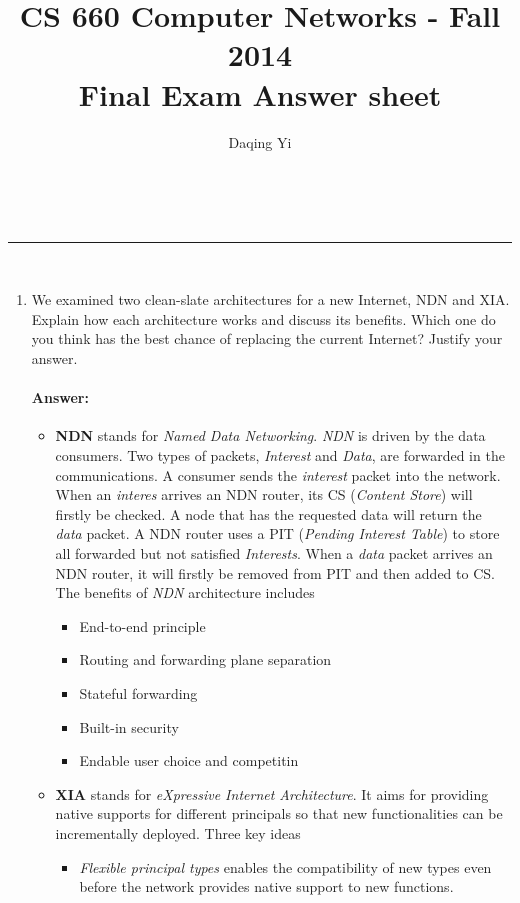 \documentclass[a4paper,11pt]{article}
\makeatletter
\newcommand{\linia}{\rule{\linewidth}{0.5pt}}
\theoremstyle{mytheor}
\renewcommand{\maketitle}{
\begin{center}
\vspace{2ex}
{\huge \textsc{\@title}}
\vspace{1ex}
\\
\linia\\
\@author \hfill \@date
\vspace{4ex}
\end{center}
}
\makeatother
\begin{document}
\title{CS 660 Computer Networks - Fall 2014 \\ Final Exam Answer sheet}

\author{Daqing Yi}

\date{}

\maketitle

\begin{enumerate}
\item 
We examined two clean-slate architectures for a new Internet, NDN and XIA. 
Explain how each architecture works and discuss its benefits. 
Which one do you think has the best chance of replacing the current Internet?
Justify your answer.
\paragraph{Answer:}
\begin{itemize}
\item
\textbf{NDN} stands for \emph{Named Data Networking}.
\emph{NDN} is driven by the data consumers.
Two types of packets, \emph{Interest} and \emph{Data}, are forwarded in the communications.
A consumer sends the \emph{interest} packet into the network.
When an \emph{interes} arrives an NDN router, its CS (\emph{Content Store}) will firstly be checked.
A node that has the requested data will return the \emph{data} packet.
A NDN router uses a PIT (\emph{Pending Interest Table}) to store all forwarded but not satisfied \emph{Interests}.
When a \emph{data} packet arrives an NDN router, it will firstly be removed from PIT and then added to CS.
The benefits of \emph{NDN} architecture includes
\begin{itemize}
	\item  End-to-end principle
	\item Routing and forwarding plane separation
	\item Stateful forwarding
	\item Built-in security
	\item Endable user choice and competitin
\end{itemize}
\item
\textbf{XIA} stands for \emph{eXpressive Internet Architecture}.
It aims for providing native supports for different principals so that new functionalities can be incrementally deployed.
Three key ideas 
\begin{itemize}
\item \emph{Flexible principal types} enables the compatibility of new types even before the network provides native support to new functions.

\end{itemize}
\end{itemize}
\end{enumerate}
\end{document}
